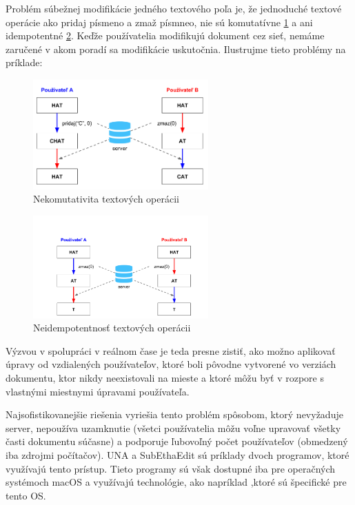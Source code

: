 Problém súbežnej modifikácie jedného textového poľa je, že jednoduché textové operácie ako
pridaj písmeno a zmaž písmneo, nie sú komutatívne \ref{obr:nekomutativita} a ani 
idempotentné \ref{obr:neidempotentnost}. Keďže používatelia
modifikujú dokument cez sieť, nemáme zaručené v akom poradí sa modifikácie uskutočnia. 
\cite {medium_crdt}
Ilustrujme tieto problémy na príklade:

\begin{figure}[h]
\centerline{\includegraphics[width=0.6\textwidth]{images/nekomutativne_operacie}}
\caption[Nekomutativita textových operácii]{Nekomutativita textových operácii}
\label{obr:nekomutativita}
\end{figure}

\begin{figure}[h]
\centerline{\includegraphics[width=0.6\textwidth]{images/neidempotentne_operacie}}
\caption[Neidempotentnosť textových operácii]{Neidempotentnosť textových operácii}
\label{obr:neidempotentnost}
\end{figure}

Výzvou v spolupráci v reálnom čase je teda presne zistiť, ako možno aplikovať úpravy
od vzdialených používateľov, ktoré boli pôvodne vytvorené vo verziách dokumentu, ktor
nikdy neexistovali na mieste a ktoré môžu byť v rozpore s vlastnými 
miestnymi úpravami používateľa.

Najsofistikovanejšie riešenia vyriešia tento problém spôsobom, ktorý nevyžaduje server,
nepoužíva uzamknutie (všetci používatelia môžu voľne upravovať všetky časti dokumentu súčasne) 
a podporuje ľubovoľný počet používateľov (obmedzený iba zdrojmi počítačov). 
UNA a SubEthaEdit sú príklady dvoch programov, ktoré využívajú tento prístup.
Tieto programy sú však dostupné iba pre operačných systémoch macOS a využívajú technológie,
ako napríklad \cite{bonjour},ktoré sú špecifické pre tento OS.

